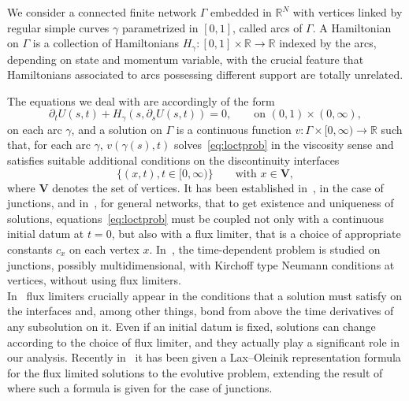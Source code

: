 \documentclass[11pt,a4paper,american]{article}
\newcommand{\Rds}{\mathds R}
\newcommand{\Vbf}{\mathbf V}
\begin{document}
    We consider a connected finite network $\Gamma$ embedded in $\Rds^N$ with vertices linked by regular simple curves $\gamma$ parametrized in $[0,1]$, called arcs of $\Gamma$. A Hamiltonian on $\Gamma$ is a collection of Hamiltonians $H_\gamma:[0,1]\times\Rds\to\Rds$ indexed by the arcs, depending on state and momentum variable, with the crucial feature that Hamiltonians associated to arcs possessing different support are totally unrelated.

    The equations we deal with are accordingly of the form
    \begin{equation}\label{eq:loctprob}
        \partial_t U(s,t)+H_\gamma(s,\partial_s U(s,t))=0,\qquad\text{on }(0,1)\times(0,\infty),
    \end{equation}
    on each arc $\gamma$, and a solution on $\Gamma$ is a continuous function $v:\Gamma\times[0,\infty)\to\Rds$ such that, for each arc $\gamma$, $v(\gamma(s),t)$ solves~\cref{eq:loctprob} in the viscosity sense and satisfies suitable additional conditions on the discontinuity interfaces
    \begin{equation*}
        \{(x,t),t\in[0,\infty)\}\qquad\text{with }x\in\Vbf,
    \end{equation*}
    where $\Vbf$ denotes the set of vertices. It has been established in~\cite{ImbertMonneau17}, in the case of junctions, and in~\cite{Siconolfi22}, for general networks, that to get existence and uniqueness of solutions, equations~\cref{eq:loctprob} must be coupled not only with a continuous initial datum at $t=0$, but also with a flux limiter, that is a choice of appropriate constants $c_x$ on each vertex $x$. In~\cite{LionsSouganidis17,Morfe20}, the time-dependent problem is studied on junctions, possibly multidimensional, with Kirchoff type Neumann conditions at vertices, without using flux limiters.\\
    In~\cite{Siconolfi22} flux limiters crucially appear in the conditions that a solution must satisfy on the interfaces and, among other things, bond from above the time derivatives of any subsolution on it. Even if an initial datum is fixed, solutions can change according to the choice of flux limiter, and they actually play a significant role in our analysis. Recently in~\cite{PozzaSiconolfi23} it has been given a Lax--Oleinik representation formula for the flux limited solutions to the evolutive problem, extending the result of~\cite{ImbertMonneauZidani12} where such a formula is given for the case of junctions.
\end{document}
